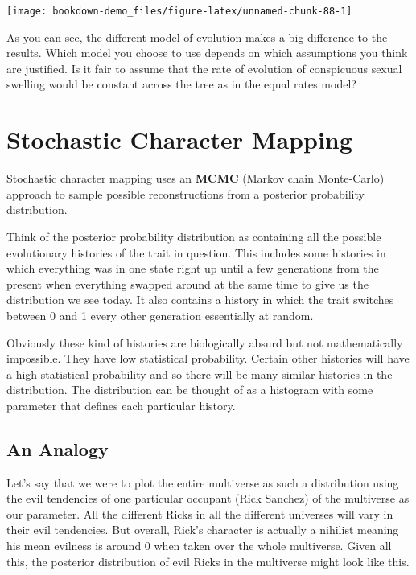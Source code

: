 \documentclass[
]{book}
\begin{document}
\begin{center}\texttt{[image: bookdown-demo\_files/figure-latex/unnamed-chunk-88-1]} \end{center}

As you can see, the different model of evolution makes a big difference to the results. Which model you choose to use depends on which assumptions you think are justified. Is it fair to assume that the rate of evolution of conspicuous sexual swelling would be constant across the tree as in the equal rates model?

\hypertarget{stochastic-character-mapping}{%
\section{Stochastic Character Mapping}\label{stochastic-character-mapping}}

Stochastic character mapping uses an \textbf{MCMC} (Markov chain Monte-Carlo) approach to sample possible reconstructions from a posterior probability distribution.

Think of the posterior probability distribution as containing all the possible evolutionary histories of the trait in question. This includes some histories in which everything was in one state right up until a few generations from the present when everything swapped around at the same time to give us the distribution we see today. It also contains a history in which the trait switches between 0 and 1 every other generation essentially at random.

Obviously these kind of histories are biologically absurd but not mathematically impossible. They have low statistical probability. Certain other histories will have a high statistical probability and so there will be many similar histories in the distribution. The distribution can be thought of as a histogram with some parameter that defines each particular history.

\hypertarget{an-analogy}{%
\subsection{An Analogy}\label{an-analogy}}

Let's say that we were to plot the entire multiverse as such a distribution using the evil tendencies of one particular occupant (Rick Sanchez) of the multiverse as our parameter. All the different Ricks in all the different universes will vary in their evil tendencies. But overall, Rick's character is actually a nihilist meaning his mean evilness is around 0 when taken over the whole multiverse. Given all this, the posterior distribution of evil Ricks in the multiverse might look like this.
\end{document}
